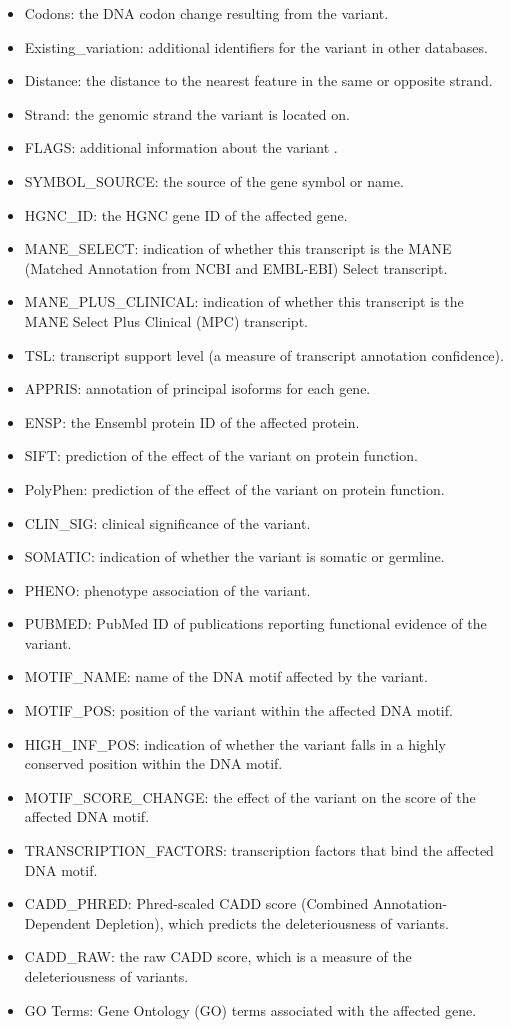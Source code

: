 \documentclass[12pt,a4paper]{article}
\begin{document}
\begin{itemize}
\item Codons: the DNA codon change resulting from the variant.
\item Existing\_variation: additional identifiers for the variant in other databases.
\item Distance: the distance to the nearest feature in the same or opposite strand.
\item Strand: the genomic strand the variant is located on.
\item FLAGS: additional information about the variant .
\item SYMBOL\_SOURCE: the source of the gene symbol or name.
\item HGNC\_ID: the HGNC gene ID of the affected gene.
\item MANE\_SELECT: indication of whether this transcript is the MANE (Matched Annotation from NCBI and EMBL-EBI) Select transcript.
\item MANE\_PLUS\_CLINICAL: indication of whether this transcript is the MANE Select Plus Clinical (MPC) transcript.
\item TSL: transcript support level (a measure of transcript annotation confidence).
\item APPRIS: annotation of principal isoforms for each gene.
\item ENSP: the Ensembl protein ID of the affected protein.
\item SIFT: prediction of the effect of the variant on protein function.
\item PolyPhen: prediction of the effect of the variant on protein function.
\item CLIN\_SIG: clinical significance of the variant.
\item SOMATIC: indication of whether the variant is somatic or germline.
\item PHENO: phenotype association of the variant.
\item PUBMED: PubMed ID of publications reporting functional evidence of the variant.
\item MOTIF\_NAME: name of the DNA motif affected by the variant.
\item MOTIF\_POS: position of the variant within the affected DNA motif.
\item HIGH\_INF\_POS: indication of whether the variant falls in a highly conserved position within the DNA motif.
\item MOTIF\_SCORE\_CHANGE: the effect of the variant on the score of the affected DNA motif.
\item TRANSCRIPTION\_FACTORS: transcription factors that bind the affected DNA motif.
\item CADD\_PHRED: Phred-scaled CADD score (Combined Annotation-Dependent Depletion), which predicts the deleteriousness of variants.
\item CADD\_RAW: the raw CADD score, which is a measure of the deleteriousness of variants.
\item GO Terms: Gene Ontology (GO) terms associated with the affected gene.

\end{itemize}
\end{document}
